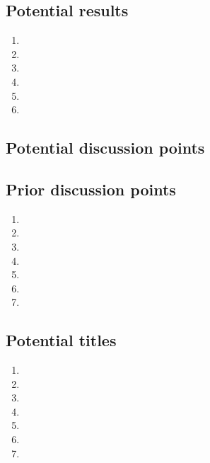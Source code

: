 \documentclass[11pt,letterpaper]{article}
\begin{document}
\subsection{Potential results}
\label{sec:orgbcc3bc8}


\begin{enumerate}
\item 

\item 

\item 

\item 

\item 

\item 
\end{enumerate}

\subsection{Potential discussion points}
\label{sec:orgd7bdce5}



\subsection{Prior discussion points}
\label{sec:org7a968ad}

\begin{enumerate}
\item 

\item 

\item 

\item 

\item 

\item 

\item 
\end{enumerate}

\subsection{Potential titles}
\label{sec:orgb561812}

\begin{enumerate}
\item 

\item 

\item 

\item 

\item 

\item 

\item 
\end{enumerate}
\end{document}
